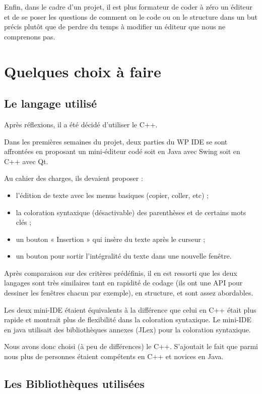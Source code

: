 Enfin, dans le cadre d'un projet, il est plus formateur de coder à zéro un éditeur et de se poser les questions de comment on le code ou on le structure dans un but précis plutôt que de perdre du temps à modifier un éditeur que nous ne comprenons pas.

\section{Quelques choix à faire}

\subsection{Le langage utilisé}

Après réflexions, il a été décidé d'utiliser le C++.

Dans les premières semaines du projet, deux parties du WP IDE se sont affrontées en proposant un mini-éditeur codé soit en Java avec Swing soit en C++ avec Qt. 

Au cahier des charges, ils devaient proposer : 

\begin{itemize}
  \item l'édition de texte avec les menus basiques (copier, coller, etc) ;
  \item la coloration syntaxique (désactivable) des parenthèses et de certains mots clés ;
  \item un bouton « Insertion » qui insère du texte après le curseur ;
  \item un bouton pour sortir l'intégralité du texte dans une nouvelle fenêtre.
\end{itemize}

Après comparaison sur des critères prédéfinis, il en est ressorti que les deux langages sont très similaires tant en rapidité de codage (ils ont une API pour dessiner les fenêtres chacun par exemple), en structure, et sont assez abordables.

Les deux mini-IDE étaient équivalents à la différence que celui en C++ était plus rapide et montrait plus de flexibilité dans la coloration syntaxique. Le mini-IDE en java utilisait des bibliothèques annexes (JLex) pour la coloration syntaxique.
    
Nous avons donc choisi (à peu de différences) le C++. S'ajoutait le fait que parmi nous plus de personnes étaient compétents en C++ et novices en Java.

\subsection{Les Bibliothèques utilisées}

